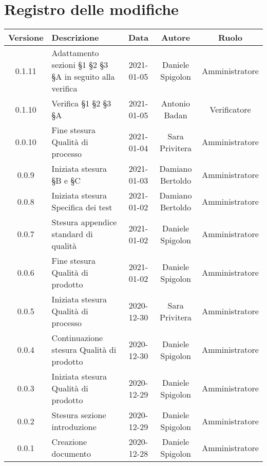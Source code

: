\section*{Registro delle modifiche}

\begin{center}
	\begin{longtable}{|c|p{5cm}|c|c|c|}
	\hline
	\rowcolor{lighter-grayer}
	\textbf{Versione} & \textbf{Descrizione} & \textbf{Data} & \textbf{Autore} & \textbf{Ruolo} \\
	\hline
	\endfirsthead

	\hline
	0.1.11 & Adattamento sezioni §1 §2 §3 §A in seguito alla verifica & 2021-01-05 & Daniele Spigolon & Amministratore \\
	\hline
	0.1.10 & Verifica §1 §2 §3 §A & 2021-01-05 & Antonio Badan & Verificatore \\
	\hline
	0.0.10 & Fine stesura Qualità di processo & 2021-01-04 & Sara Privitera & Amministratore \\
	\hline
	0.0.9 & Iniziata stesura §B e §C & 2021-01-03 & Damiano Bertoldo & Amministratore \\
	\hline
	0.0.8 & Iniziata stesura Specifica dei test & 2021-01-02 & Damiano Bertoldo & Amministratore \\
	\hline
	0.0.7 & Stesura appendice standard di qualità & 2021-01-02 & Daniele Spigolon & Amministratore \\
	\hline
	0.0.6 & Fine stesura Qualità di prodotto & 2021-01-02 & Daniele Spigolon & Amministratore \\
	\hline
	0.0.5 & Iniziata stesura Qualità di processo & 2020-12-30 & Sara Privitera & Amministratore \\
	\hline
	0.0.4 & Continuazione stesura Qualità di prodotto & 2020-12-30 & Daniele Spigolon & Amministratore \\
	\hline
	0.0.3 & Iniziata stesura Qualità di prodotto & 2020-12-29 & Daniele Spigolon & Amministratore \\
	\hline
	0.0.2 & Stesura sezione introduzione & 2020-12-29 & Daniele Spigolon & Amministratore \\
	\hline
	0.0.1 & Creazione documento & 2020-12-28 & Daniele Spigolon & Amministratore \\
	\hline

	\end{longtable}
\end{center}